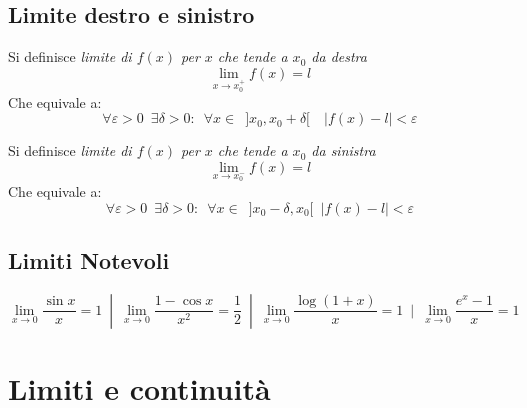 \documentclass[10pt, oneside]{book}
\theoremstyle{plain}
\begin{document}
\section{Limite destro e sinistro}
\begin{defin}
Si definisce \textit{limite di $f(x)$ per $x$ che tende a $x_0$ da destra} 
\[\lim \limits_{x \rightarrow x_0^{+}} f(x) = l\]
Che equivale a:
\[\forall \varepsilon > 0 \enspace \exists \delta > 0 : \enspace \forall x \in \enspace ]x_0, x_0 + \delta[ \quad |f(x) - l| < \varepsilon\]
\end{defin}
\begin{defin}
Si definisce \textit{limite di $f(x)$ per $x$ che tende a $x_0$ da sinistra} 
\[\lim \limits_{x \rightarrow x_0^{-}} f(x) = l\]
Che equivale a:
\[\forall \varepsilon > 0 \enspace \exists \delta > 0 : \enspace \forall x \in \enspace ]x_0 - \delta, x_0[ \enspace |f(x) - l| < \varepsilon\]
\end{defin}

\section{Limiti Notevoli}

\[\lim \limits_{x \rightarrow 0} \frac{\sin x}{x} = 1 \enspace | \enspace \lim \limits_{x \rightarrow 0} \frac{1 - \cos x}{x^2} = \frac{1}{2} \enspace | \enspace \lim \limits_{x \rightarrow 0} \frac{\log (1+x)}{x} = 1 \enspace | \enspace \lim \limits_{x \rightarrow 0} \frac{e^x - 1}{x} = 1\]


\chapter{Limiti e continuità}
\end{document}
